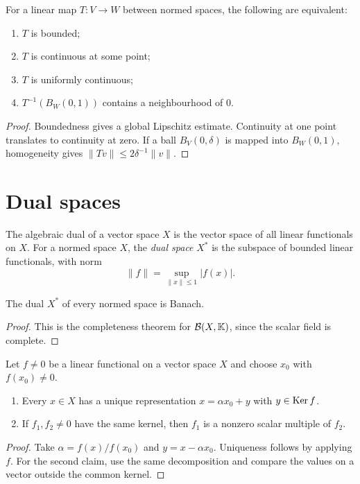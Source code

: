 \begin{notetheorem}
For a linear map $T\colon V\to W$ between normed spaces, the following are
equivalent:
\begin{enumerate}
  \item $T$ is bounded;
  \item $T$ is continuous at some point;
  \item $T$ is uniformly continuous;
  \item $T^{-1}(B_W(0,1))$ contains a neighbourhood of $0$.
\end{enumerate}
\end{notetheorem}

\begin{proof}
Boundedness gives a global Lipschitz estimate.  Continuity at one point
translates to continuity at zero.  If a ball $B_V(0,\delta)$ is mapped into
$B_W(0,1)$, homogeneity gives $\|Tv\|\le2\delta^{-1}\|v\|$.
\end{proof}

\section{Dual spaces}

\begin{notedefinition}
The algebraic dual of a vector space $X$ is the vector space of all linear
functionals on $X$.  For a normed space $X$, the \emph{dual space} $X^*$ is
the subspace of bounded linear functionals, with norm
\[
  \|f\|=\sup_{\|x\|\le1}|f(x)|.
\]
\end{notedefinition}

\begin{notetheorem}
The dual $X^*$ of every normed space is Banach.
\end{notetheorem}

\begin{proof}
This is the completeness theorem for $\mathcal{B}(X,\mathbb K)$, since the scalar
field is complete.
\end{proof}

\begin{noteexercise}
Let $f\ne0$ be a linear functional on a vector space $X$ and choose
$x_0$ with $f(x_0)\ne0$.
\begin{enumerate}
  \item Every $x\in X$ has a unique representation
        $x=\alpha x_0+y$ with $y\in\operatorname{Ker} f$.
  \item If $f_1,f_2\ne0$ have the same kernel, then $f_1$ is a nonzero scalar
        multiple of $f_2$.
\end{enumerate}
\end{noteexercise}

\begin{proof}
Take $\alpha=f(x)/f(x_0)$ and $y=x-\alpha x_0$.  Uniqueness follows by
applying $f$.  For the second claim, use the same decomposition and compare
the values on a vector outside the common kernel.
\end{proof}
